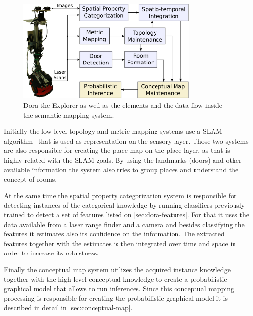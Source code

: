 \begin{figure}[h]
\centering
\includegraphics[width=0.8\textwidth]{figures/dora-architecture.pdf}
\caption{\label{fig:dora-architecture}Dora the Explorer as well as the elements and the data flow inside
         the semantic mapping system.}
\end{figure}

Initially the low-level topology and metric mapping systems use a \gls{SLAM} algorithm~\cite{Folkesson07a}
that is used as representation on the sensory layer. Those two systems are also responsible
for creating the place map on the place layer, as that is highly related with the \gls{SLAM} goals.
By using the landmarks (doors) and other available information the system also tries to
group places and understand the concept of rooms.

At the same time the spatial property categorization system is responsible for detecting
instances of the categorical knowledge by running classifiers previously trained to detect
a set of features listed on \autoref{sec:dora-features}. For that it uses the data available
from a laser range finder and a camera and besides classifying the features it estimates also
its confidence on the information.
The extracted features together with the estimates is then integrated over time and space
in order to increase its robustness.

Finally the conceptual map system utilizes the acquired instance knowledge together with
the high\hyp{}level conceptual knowledge to create a probabilistic graphical model that allows
to run inferences.
Since this conceptual mapping processing is responsible for creating the probabilistic
graphical model it is described in detail in \autoref{sec:conceptual-map}.



